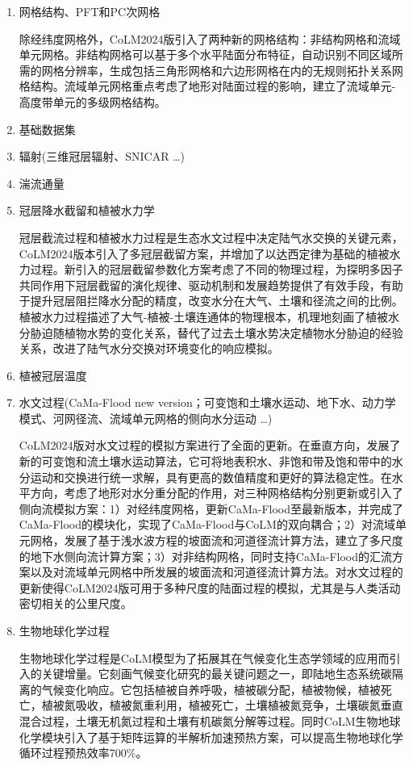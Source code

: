 \begin{enumerate}[label={\arabic*)}]
    \item 网格结构、PFT和PC次网格

    除经纬度网格外，CoLM2024版引入了两种新的网格结构：非结构网格和流域单元网格。非结构网格可以基于多个水平陆面分布特征，自动识别不同区域所需的网格分辨率，生成包括三角形网格和六边形网格在内的无规则拓扑关系网格结构。流域单元网格重点考虑了地形对陆面过程的影响，建立了流域单元-高度带单元的多级网格结构。
    
    \item 基础数据集
    \item 辐射(三维冠层辐射、SNICAR …)
    \item 湍流通量
    \item 冠层降水截留和植被水力学

    冠层截流过程和植被水力过程是生态水文过程中决定陆气水交换的关键元素，CoLM2024版本引入了多冠层截留方案，并增加了以达西定律为基础的植被水力过程。新引入的冠层截留参数化方案考虑了不同的物理过程，为探明多因子共同作用下冠层截留的演化规律、驱动机制和发展趋势提供了有效手段，有助于提升冠层阻拦降水分配的精度，改变水分在大气、土壤和径流之间的比例。植被水力过程描述了大气-植被-土壤连通体的物理根本，机理地刻画了植被水分胁迫随植物水势的变化关系，替代了过去土壤水势决定植物水分胁迫的经验关系，改进了陆气水分交换对环境变化的响应模拟。

    \item 植被冠层温度
    
    \item 水文过程(CaMa-Flood new version；可变饱和土壤水运动、地下水、动力学模式、河网径流、流域单元网格的侧向水分运动 …)

    CoLM2024版对水文过程的模拟方案进行了全面的更新。在垂直方向，发展了新的可变饱和流土壤水运动算法，它可将地表积水、非饱和带及饱和带中的水分运动和交换进行统一求解，具有更高的数值精度和更好的算法稳定性。在水平方向，考虑了地形对水分重分配的作用，对三种网格结构分别更新或引入了侧向流模拟方案：1）对经纬度网格，更新CaMa-Flood至最新版本，并完成了CaMa-Flood的模块化，实现了CaMa-Flood与CoLM的双向耦合；2）对流域单元网格，发展了基于浅水波方程的坡面流和河道径流计算方法，建立了多尺度的地下水侧向流计算方案；3）对非结构网格，同时支持CaMa-Flood的汇流方案以及对流域单元网格中所发展的坡面流和河道径流计算方法。对水文过程的更新使得CoLM2024版可用于多种尺度的陆面过程的模拟，尤其是与人类活动密切相关的公里尺度。
    
    \item 生物地球化学过程

    生物地球化学过程是CoLM模型为了拓展其在气候变化生态学领域的应用而引入的关键增量。它刻画气候变化研究的最关键问题之一，即陆地生态系统碳隔离的气候变化响应。它包括植被自养呼吸，植被碳分配，植被物候，植被死亡，植被氮吸收，植被氮重利用，植被死亡，土壤植被氮竞争，土壤碳氮垂直混合过程，土壤无机氮过程和土壤有机碳氮分解等过程。同时CoLM生物地球化学模块引入了基于矩阵运算的半解析加速预热方案，可以提高生物地球化学循环过程预热效率700\%。


\end{enumerate}
